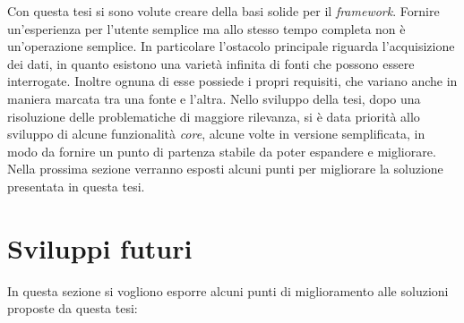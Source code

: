 Con questa tesi si sono volute creare della basi solide per il \emph{framework}. Fornire un'esperienza per l'utente semplice ma allo stesso tempo completa non è un'operazione semplice. In particolare l'ostacolo principale riguarda l'acquisizione dei dati, in quanto esistono una varietà infinita di fonti che possono essere interrogate. Inoltre ognuna di esse possiede i propri requisiti, che variano anche in maniera marcata tra una fonte e l'altra. Nello sviluppo della tesi, dopo una risoluzione delle problematiche di maggiore rilevanza, si è data priorità allo sviluppo di alcune funzionalità \emph{core}, alcune volte in versione semplificata, in modo da fornire un punto di partenza stabile da poter espandere e migliorare. Nella prossima sezione verranno esposti alcuni punti per migliorare la soluzione presentata in questa tesi.

\section{Sviluppi futuri}

In questa sezione si vogliono esporre alcuni punti di miglioramento alle soluzioni proposte da questa tesi:

